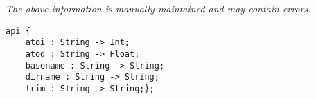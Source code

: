 \label{api:String\_Junk}

{\tiny \it The above information is manually maintained and may contain errors.}
\begin{verbatim}
api {
    atoi : String -> Int;
    atod : String -> Float;
    basename : String -> String;
    dirname : String -> String;
    trim : String -> String;};
\end{verbatim}
